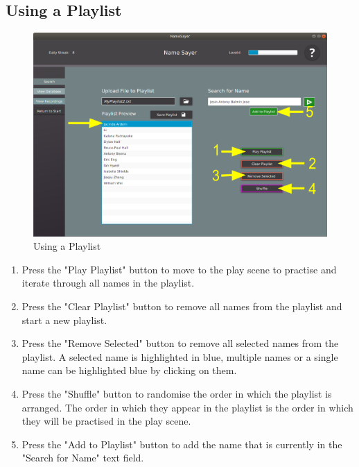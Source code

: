 \documentclass[a4paper,12pt]{article}
\begin{document}
\subsection{Using a Playlist}
\begin{figure}[!h]
\includegraphics[width=\linewidth]{playlist.png}
\caption{Using a Playlist}
\end{figure}
\begin{enumerate}[label=\textbf{\arabic*}]
	\item Press the "Play Playlist" button to move to the play scene to practise and iterate through all names in the playlist.
	
	\item Press the "Clear Playlist" button to remove all names from the playlist and start a new playlist.
	
	\item Press the "Remove Selected" button to remove all selected names from the playlist. A selected name is highlighted in blue, multiple names or a single name can be highlighted blue by clicking on them.
	
	\item Press the "Shuffle" button to randomise the order in which the playlist is arranged. The order in which they appear in the playlist is the order in which they will be practised in the play scene.
	
	\item Press the "Add to Playlist" button to add the name that is currently in the "Search for Name" text field.
\end{enumerate}
\newpage
\end{document}
